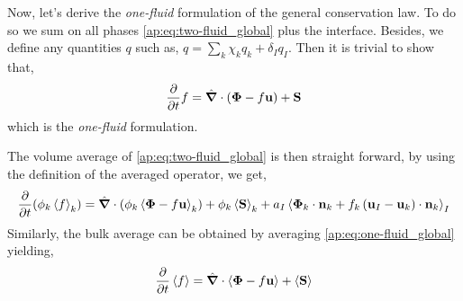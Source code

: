 Now, let's derive the \textit{one-fluid} formulation of the general conservation law.
To do so we sum on all phases \ref{ap:eq:two-fluid_global} plus the interface. 
Besides, we define any quantities $q$ such as, $q = \sum_k \chi_k q_k + \delta_I q_I$.
Then it is trivial to show that, 
\begin{equation}
    \frac{\partial}{\partial t} f
    = \hat{\bm{\nabla}} \cdot (\bm{\Phi} - f \textbf{u})
    + \textbf{S}
    \label{ap:eq:one-fluid_global}
\end{equation}
which is the \textit{one-fluid} formulation. 

The volume average of \ref{ap:eq:two-fluid_global} is then straight forward, by using the definition of the averaged operator, we get, 
\begin{equation*}
    \frac{\partial}{\partial t} (\phi_k\left<f\right>_k)
    = \hat{\bm{\nabla}} \cdot \left(
        \phi_k \left<\bm{\Phi} - f \textbf{u}\right>_k
    \right)
    + \phi_k \left<\textbf{S}\right>_k
    + a_I \left<
        \bm{\Phi}_k \cdot \textbf{n}_k
        + f_k 
        \left(
            \textbf{u}_I
            - \textbf{u}_k
        \right) \cdot \textbf{n}_k
    \right>_I 
\end{equation*}
Similarly, the bulk average can be obtained by averaging \ref{ap:eq:one-fluid_global} yielding, 
\begin{equation*}
    \frac{\partial}{\partial t} \left<f\right>
    = \hat{\bm{\nabla}} \cdot \left<\bm{\Phi} - f \textbf{u}\right>
    + \left<\textbf{S}\right>
    \label{ap:eq:avg_global}
\end{equation*}
